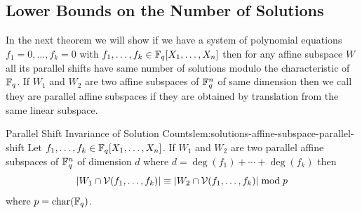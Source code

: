 \subsection{Lower Bounds on the Number of Solutions}

In the next theorem we will show if we have a system of polynomial equations $f_1=0,\dots,f_k=0$ with $f_1,\dots,f_k\in\mathbb{F}_q[X_1,\dots,X_n]$ then for any affine subspace $W$ all its parallel shifts have same number of solutions modulo the characteristic of $\mathbb{F}_q$. If $W_1$ and $W_2$ are two affine subspaces of $\mathbb{F}_q^n$ of same dimension then we call they are parallel affine subspaces if they are obtained by translation from the same linear subspace. 
\begin{lemma}{Parallel Shift Invariance of Solution Counts}{lem:solutions-affine-subspace-parallel-shift}
  Let $f_1,\dots, f_k\in\mathbb{F}_q[X_1,\dots, X_n]$.  If $W_1$ and $W_2$ are two parallel affine subspaces of $\mathbb{F}_q^n$ of dimension $d$ where $d=\deg(f_1)+\cdots+\deg(f_k)$ then $$|W_1\cap \mathcal{V}(f_1,\dots,f_k)|\equiv |W_2\cap \mathcal{V}(f_1,\dots, f_k)|\bmod p$$where $p=\operatorname{char}(\mathbb{F}_q)$. 
\end{lemma}
